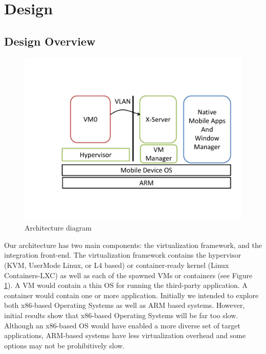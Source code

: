 \section{Design}
\subsection{Design Overview}

\begin{figure}[tbh]
\centering
\includegraphics[width=1.0\columnwidth]{arch}
\caption{Architecture diagram}
\label{fig:arch}
\end{figure}

\label{sec:proposedarch}
Our architecture has two main components: the virtualization framework, and the integration front-end.  The virtualization framework contains the hypervisor (KVM, UserMode Linux, or L4 based) or container-ready kernel (Linux Containers-LXC) as well as each of the spawned VMs or containers (see Figure \ref{fig:arch}).  A VM would contain a thin OS for running the third-party application.  A container would contain one or more application.  Initially we intended to explore both x86-based Operating Systems as well as ARM based systems.  However, initial results show that x86-based Operating Systems will be far too slow.  Although an x86-based OS would have enabled a more diverse set of target applications, ARM-based systems have less virtualization overhead and some options may not be prohibitively slow. %

